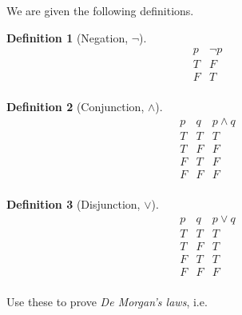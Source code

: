 \documentclass[addpoints]{exam}
\theoremstyle{definition}
\newtheorem{definition}{Definition}[section]
\theoremstyle{claim}
\begin{document}
\begin{questions}
  \question[5] We are given the following definitions.

\begin{definition}[Negation, $\neg$]
  \[
  \begin{array}{c||c}
    p & \neg p\\
    \hline
    T & F \\
    F & T \\
  \end{array}
  \]
\end{definition}

\begin{definition}[Conjunction, $\land$]
  \[
  \begin{array}{c|c||c}
    p & q & p \land q\\
    \hline
    T & T & T \\
    T & F & F \\
    F & T & F \\
    F & F & F \\
  \end{array}
  \]
\end{definition}

\begin{definition}[Disjunction, $\lor$]
  \[
  \begin{array}{c|c||c}
    p & q & p \lor q\\
    \hline
    T & T & T \\
    T & F & T \\
    F & T & T \\
    F & F & F \\
  \end{array}
  \]
\end{definition}

Use these to prove \textit{De Morgan's laws}, i.e.
  

\end{questions}
\end{document}
